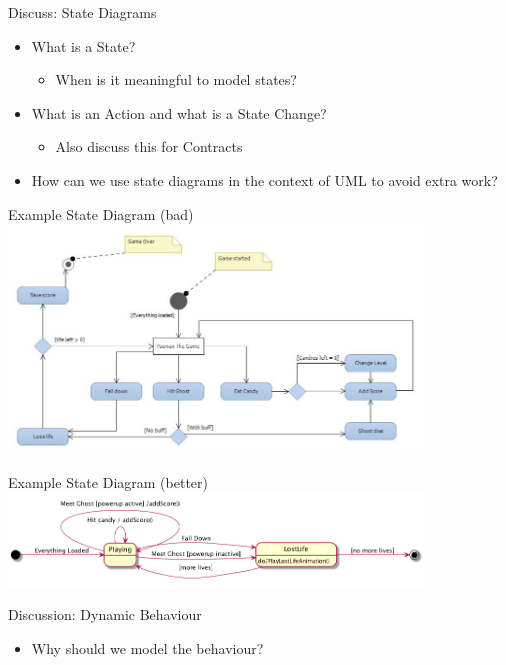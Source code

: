 \documentclass[10pt,t,a4paper]{beamer}
\begin{document}
\begin{frame}[label=sec-1-7]{Discuss: State Diagrams}
\begin{itemize}
\item What is a State?
\begin{itemize}
\item When is it meaningful to model states?
\end{itemize}
\item What is an Action and what is a State Change?
\begin{itemize}
\item Also discuss this for Contracts
\end{itemize}
\item How can we use state diagrams in the context of UML to avoid extra work?
\end{itemize}
\end{frame}
\begin{frame}[label=sec-1-8]{Example State Diagram (bad)}
\includegraphics[width=11cm]{./FExampleBadStateChart.png}
\end{frame}
\begin{frame}[label=sec-1-9]{Example State Diagram (better)}
\includegraphics[width=11cm]{FExampleBadStateChart_fixed.png}
\end{frame}
\begin{frame}[label=sec-1-10]{Discussion: Dynamic Behaviour}
\begin{itemize}
\item Why should we model the behaviour?
\end{itemize}
\end{frame}
\end{document}
